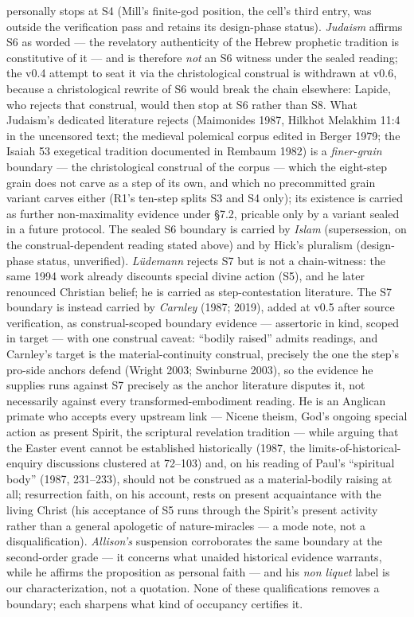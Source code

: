personally stops at S4 (Mill's finite-god position, the cell's third entry, was outside the verification pass and retains its design-phase status). \emph{Judaism} affirms S6 as worded --- the revelatory authenticity of the Hebrew prophetic tradition is constitutive of it --- and is therefore \emph{not} an S6 witness under the sealed reading; the v0.4 attempt to seat it via the christological construal is withdrawn at v0.6, because a christological rewrite of S6 would break the chain elsewhere: Lapide, who rejects that construal, would then stop at S6 rather than S8. What Judaism's dedicated literature rejects (Maimonides 1987, Hilkhot Melakhim 11:4 in the uncensored text; the medieval polemical corpus edited in Berger 1979; the Isaiah 53 exegetical tradition documented in Rembaum 1982) is a \emph{finer-grain} boundary --- the christological construal of the corpus --- which the eight-step grain does not carve as a step of its own, and which no precommitted grain variant carves either (R1's ten-step splits S3 and S4 only); its existence is carried as further non-maximality evidence under \S{}7.2, pricable only by a variant sealed in a future protocol. The sealed S6 boundary is carried by \emph{Islam} (supersession, on the construal-dependent reading stated above) and by Hick's pluralism (design-phase status, unverified). \emph{Lüdemann} rejects S7 but is not a chain-witness: the same 1994 work already discounts special divine action (S5), and he later renounced Christian belief; he is carried as step-contestation literature. The S7 boundary is instead carried by \emph{Carnley} (1987; 2019), added at v0.5 after source verification, as construal-scoped boundary evidence --- assertoric in kind, scoped in target --- with one construal caveat: ``bodily raised'' admits readings, and Carnley's target is the material-continuity construal, precisely the one the step's pro-side anchors defend (Wright 2003; Swinburne 2003), so the evidence he supplies runs against S7 precisely as the anchor literature disputes it, not necessarily against every transformed-embodiment reading. He is an Anglican primate who accepts every upstream link --- Nicene theism, God's ongoing special action as present Spirit, the scriptural revelation tradition --- while arguing that the Easter event cannot be established historically (1987, the limits-of-historical-enquiry discussions clustered at 72--103) and, on his reading of Paul's ``spiritual body'' (1987, 231--233), should not be construed as a material-bodily raising at all; resurrection faith, on his account, rests on present acquaintance with the living Christ (his acceptance of S5 runs through the Spirit's present activity rather than a general apologetic of nature-miracles --- a mode note, not a disqualification). \emph{Allison's} suspension corroborates the same boundary at the second-order grade --- it concerns what unaided historical evidence warrants, while he affirms the proposition as personal faith --- and his \emph{non liquet} label is our characterization, not a quotation. None of these qualifications removes a boundary; each sharpens what kind of occupancy certifies it.

